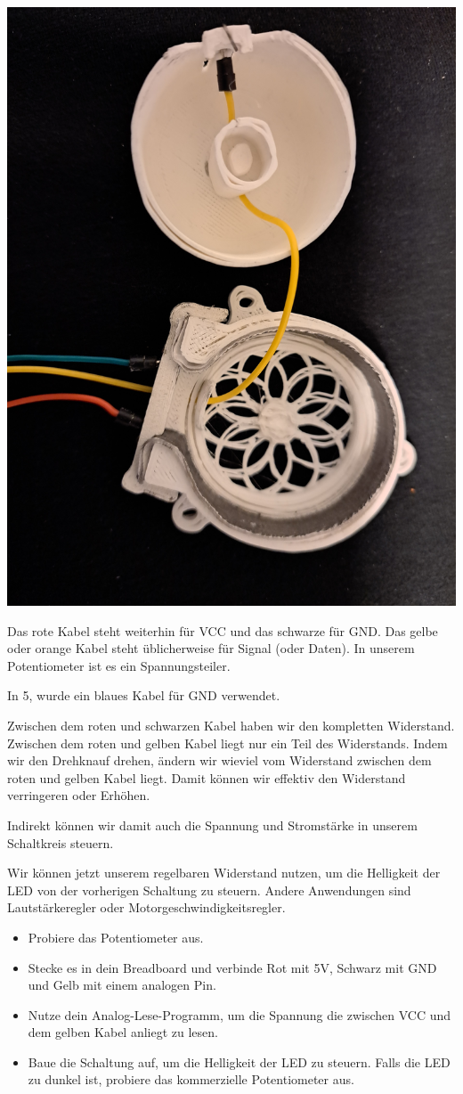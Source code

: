 \documentclass[a4paper,12pt]{book}
\begin{document}
\begin{center}
  \includegraphics[width=.7\textwidth]{images/poti.jpg}
\end{center}

Das rote Kabel steht weiterhin für VCC und das schwarze für GND.
Das gelbe oder orange Kabel steht üblicherweise für Signal (oder Daten).
In unserem Potentiometer ist es ein Spannungsteiler.

In 5, wurde ein blaues Kabel für GND verwendet.

Zwischen dem roten und schwarzen Kabel haben wir den kompletten Widerstand.
Zwischen dem roten und gelben Kabel liegt nur ein Teil des Widerstands.
Indem wir den Drehknauf drehen, ändern wir wieviel vom Widerstand zwischen dem roten und gelben Kabel liegt.
Damit können wir effektiv den Widerstand verringeren oder Erhöhen.

Indirekt können wir damit auch die Spannung und Stromstärke in unserem Schaltkreis steuern.

Wir können jetzt unserem regelbaren Widerstand nutzen, um die Helligkeit der LED von der vorherigen Schaltung zu steuern.
Andere Anwendungen sind Lautstärkeregler oder Motorgeschwindigkeitsregler.

\begin{instruction}
\begin{itemize}
  \item Probiere das Potentiometer aus.
  \item Stecke es in dein Breadboard und verbinde Rot mit 5V, Schwarz mit GND und Gelb mit einem analogen Pin.
  \item Nutze dein Analog-Lese-Programm, um die Spannung die zwischen VCC und dem gelben Kabel anliegt zu lesen.
  \item Baue die Schaltung auf, um die Helligkeit der LED zu steuern. Falls die LED zu dunkel ist, probiere das kommerzielle Potentiometer aus.
\end{itemize}
\end{instruction}
\end{document}
